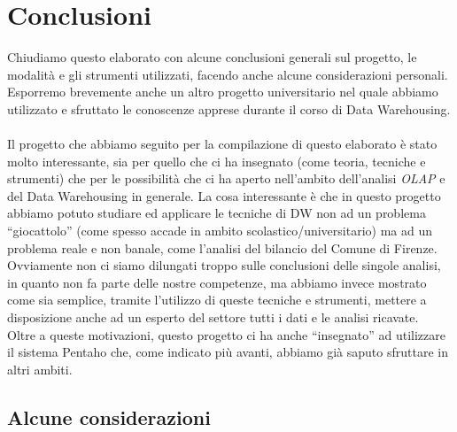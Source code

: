 \chapter*{Conclusioni}
	
	\renewcommand\thefigure{C.\arabic{figure}}
	\setcounter{figure}{0}

	Chiudiamo questo elaborato con alcune conclusioni generali sul progetto, le modalità e gli strumenti utilizzati, facendo anche alcune considerazioni personali. Esporremo brevemente anche un altro progetto universitario nel quale abbiamo utilizzato e sfruttato le conoscenze apprese durante il corso di Data Warehousing.\\
	\\
	Il progetto che abbiamo seguito per la compilazione di questo elaborato è stato molto interessante, sia per quello che ci ha insegnato (come teoria, tecniche e strumenti) che per le possibilità che ci ha aperto nell'ambito dell'analisi \textit{OLAP} e del Data Warehousing in generale. La cosa interessante è che in questo progetto abbiamo potuto studiare ed applicare le tecniche di DW non ad un problema ``giocattolo'' (come spesso accade in ambito scolastico/universitario) ma ad un problema reale e non banale, come l'analisi del bilancio del Comune di Firenze. Ovviamente non ci siamo dilungati troppo sulle conclusioni delle singole analisi, in quanto non fa parte delle nostre competenze, ma abbiamo invece mostrato come sia semplice, tramite l'utilizzo di queste tecniche e strumenti, mettere a disposizione anche ad un esperto del settore tutti i dati e le analisi ricavate.\\
	Oltre a queste motivazioni, questo progetto ci ha anche ``insegnato'' ad utilizzare il sistema Pentaho che, come indicato più avanti, abbiamo già saputo sfruttare in altri ambiti.

	\section*{Alcune considerazioni}


